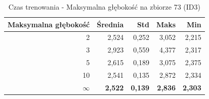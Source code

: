 \begin{table}[htbp]
\centering
\small
\setlength{\tabcolsep}{6pt}
\renewcommand{\arraystretch}{1.2}
\caption{Czas trenowania - Maksymalna głębokość na zbiorze 73 (ID3)}
\label{tab:ID3_max_depth_73_time}
\begin{tabular}{r|r|r|r|r}
\toprule
Maksymalna głębokość & Średnia & Std & Maks & Min \\
\hline
2 & 2,524 & 0,252 & 3,052 & 2,215 \\
3 & 2,923 & 0,559 & 4,377 & 2,317 \\
5 & 2,615 & 0,189 & 3,075 & 2,375 \\
10 & 2,541 & 0,135 & 2,872 & 2,334 \\
\textbf{$\infty$} & \textbf{2,522} & \textbf{0,139} & \textbf{2,836} & \textbf{2,303} \\
\bottomrule
\end{tabular}
\end{table}